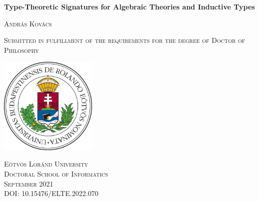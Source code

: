 \documentclass[12pt,a4paper,twoside,openany]{book}
\theoremstyle{remark}
\theoremstyle{definition}
\theoremstyle{theorem}
\begin{document}
\clearpage


\begin{titlepage}
    \begin{center}
        \vspace*{1cm}

        {\LARGE \textbf{Type-Theoretic Signatures for Algebraic Theories and Inductive Types}}

        \vspace{2em}

        {\Large \textsc{ András Kovács}}\\

        \vfill

        {\large \textsc{Submitted in fulfillment of the requirements
        for the degree of Doctor of Philosophy}}\\

        \vspace{0.8cm}

        \includegraphics[width=0.35\textwidth]{elte_cimer_szines}

        \large \textsc{
        Eötvös Loránd University\\
        Doctoral School of Informatics\\
        September 2021}
        \\
        \vspace{2em}
        \small{\textsc{DOI: 10.15476/ELTE.2022.070}}

    \end{center}
\end{titlepage}



\thispagestyle{empty}
\end{document}

